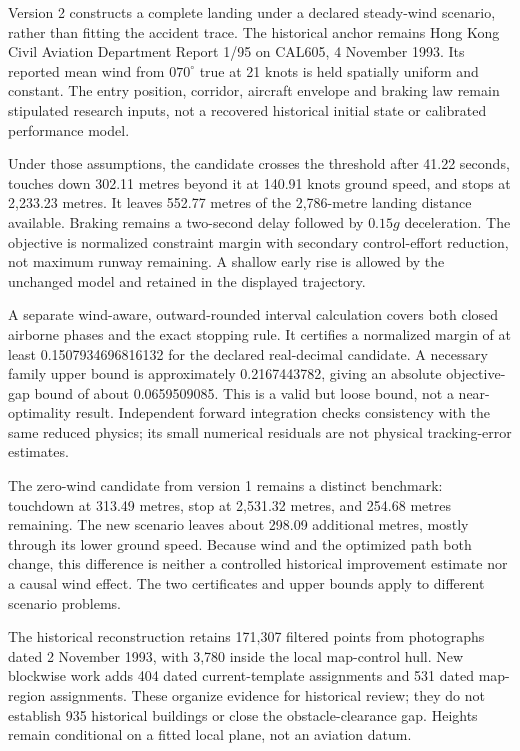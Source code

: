 \documentclass[11pt,a4paper]{article}
\begin{document}
Version 2 constructs a complete landing under a declared steady-wind scenario, rather than fitting the accident trace. The historical anchor remains Hong Kong Civil Aviation Department Report 1/95 on CAL605, 4 November 1993. Its reported mean wind from $070^\circ$ true at 21 knots is held spatially uniform and constant. The entry position, corridor, aircraft envelope and braking law remain stipulated research inputs, not a recovered historical initial state or calibrated performance model.

Under those assumptions, the candidate crosses the threshold after 41.22 seconds, touches down 302.11 metres beyond it at 140.91 knots ground speed, and stops at 2,233.23 metres. It leaves 552.77 metres of the 2,786-metre landing distance available. Braking remains a two-second delay followed by $0.15g$ deceleration. The objective is normalized constraint margin with secondary control-effort reduction, not maximum runway remaining. A shallow early rise is allowed by the unchanged model and retained in the displayed trajectory.

A separate wind-aware, outward-rounded interval calculation covers both closed airborne phases and the exact stopping rule. It certifies a normalized margin of at least 0.1507934696816132 for the declared real-decimal candidate. A necessary family upper bound is approximately 0.2167443782, giving an absolute objective-gap bound of about 0.0659509085. This is a valid but loose bound, not a near-optimality result. Independent forward integration checks consistency with the same reduced physics; its small numerical residuals are not physical tracking-error estimates.

The zero-wind candidate from version 1 remains a distinct benchmark: touchdown at 313.49 metres, stop at 2,531.32 metres, and 254.68 metres remaining. The new scenario leaves about 298.09 additional metres, mostly through its lower ground speed. Because wind and the optimized path both change, this difference is neither a controlled historical improvement estimate nor a causal wind effect. The two certificates and upper bounds apply to different scenario problems.

The historical reconstruction retains 171,307 filtered points from photographs dated 2 November 1993, with 3,780 inside the local map-control hull. New blockwise work adds 404 dated current-template assignments and 531 dated map-region assignments. These organize evidence for historical review; they do not establish 935 historical buildings or close the obstacle-clearance gap. Heights remain conditional on a fitted local plane, not an aviation datum.
\end{document}
